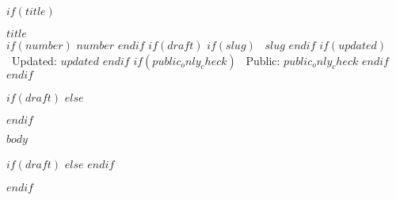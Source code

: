 $if(title)$
\begin{center}
  {\LARGE\bfseries $title$}\\[6pt]
  {\small
    $if(number)$ $number$ $endif$
    $if(draft)$
    $if(slug)$ \textbullet\ $slug$ $endif$
    $if(updated)$ \textbullet\ Updated: $updated$ $endif$
    $if(public_only_check)$ \textbullet\ Public: $public_only_check$ $endif$
    $endif$
  }
\end{center}
$if(draft)$
$else$
\begingroup
  \setcounter{tocdepth}{0}
  \let\oldsubsection\subsection
  \renewcommand{\subsection}[1]{\oldsubsection*{##1}}
$endif$

$body$

$if(draft)$
$else$
\endgroup
$endif$

\clearpage

$endif$

